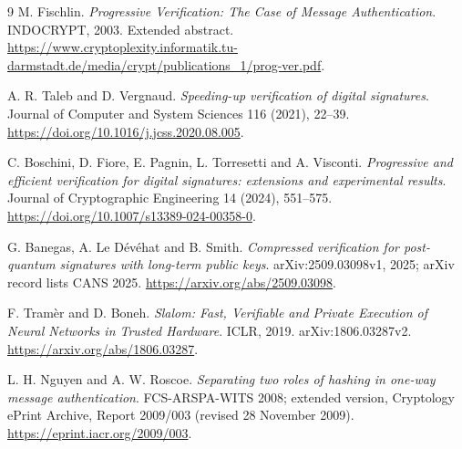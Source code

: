 \documentclass[11pt,letterpaper]{article}
\theoremstyle{definition}
\begin{document}
\begin{thebibliography}{9}
M. Fischlin.
\emph{Progressive Verification: The Case of Message Authentication}.
INDOCRYPT, 2003. Extended abstract.
\url{https://www.cryptoplexity.informatik.tu-darmstadt.de/media/crypt/publications_1/prog-ver.pdf}.

A. R. Taleb and D. Vergnaud.
\emph{Speeding-up verification of digital signatures}.
Journal of Computer and System Sciences 116 (2021), 22--39.
\url{https://doi.org/10.1016/j.jcss.2020.08.005}.

C. Boschini, D. Fiore, E. Pagnin, L. Torresetti and A. Visconti.
\emph{Progressive and efficient verification for digital signatures: extensions and experimental results}.
Journal of Cryptographic Engineering 14 (2024), 551--575.
\url{https://doi.org/10.1007/s13389-024-00358-0}.

G. Banegas, A. Le D\'ev\'ehat and B. Smith.
\emph{Compressed verification for post-quantum signatures with long-term public keys}.
arXiv:2509.03098v1, 2025; arXiv record lists CANS 2025.
\url{https://arxiv.org/abs/2509.03098}.

F. Tram\`er and D. Boneh.
\emph{Slalom: Fast, Verifiable and Private Execution of Neural Networks in Trusted Hardware}.
ICLR, 2019. arXiv:1806.03287v2.
\url{https://arxiv.org/abs/1806.03287}.

L. H. Nguyen and A. W. Roscoe.
\emph{Separating two roles of hashing in one-way message authentication}.
FCS-ARSPA-WITS 2008; extended version, Cryptology ePrint Archive, Report 2009/003 (revised 28 November 2009).
\url{https://eprint.iacr.org/2009/003}.
\end{thebibliography}
\end{document}

